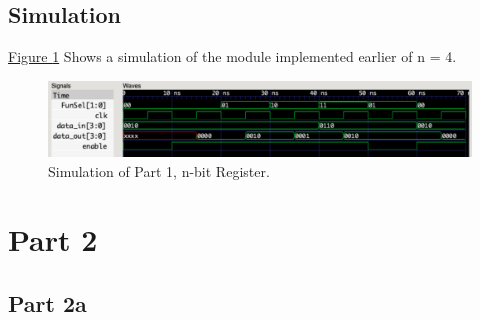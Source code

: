 \documentclass[pdftex,12pt,a4paper]{article}
\begin{document}
\subsection{Simulation}
\hyperref[fig:part1_sim.png]{Figure \ref{fig:part1_sim}} Shows a simulation of the module implemented earlier of n = 4.
\begin{figure}[H]
\centering
\includegraphics[width=1\textwidth]{part1_sim.png}
\caption{Simulation of Part 1, n-bit Register.}
\label{fig:part1_sim}
\end{figure}

\section{Part 2}

\subsection{Part 2a}
\end{document}
